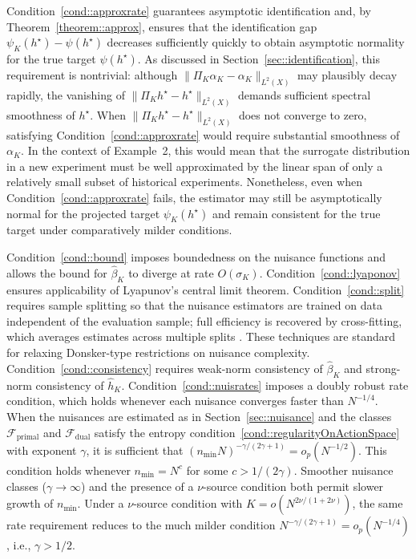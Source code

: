 \documentclass[11pt]{article}
\theoremstyle{plain}
\theoremstyle{definition}
\theoremstyle{remark}
\theoremstyle{definition}
\begin{document}
Condition~\ref{cond::approxrate} guarantees asymptotic identification and, by
Theorem~\ref{theorem::approx}, ensures that the identification gap
\(\psi_K(h^\star) - \psi(h^\star)\) decreases sufficiently quickly to obtain
asymptotic normality for the true target \(\psi(h^\star)\). As discussed in
Section~\ref{sec::identification}, this requirement is nontrivial: although
\(\|\Pi_K \alpha_K - \alpha_K\|_{L^2(X)}\) may plausibly decay rapidly, the
vanishing of \(\|\Pi_K h^\star - h^\star\|_{L^2(X)}\) demands sufficient spectral
smoothness of \(h^\star\). When \(\|\Pi_K h^\star - h^\star\|_{L^2(X)}\) does not
converge to zero, satisfying Condition~\ref{cond::approxrate} would require
substantial smoothness of \(\alpha_K\). In the context of Example~2, this would
mean that the surrogate distribution in a new experiment must be well
approximated by the linear span of only a relatively small subset of historical
experiments. Nonetheless, even when Condition~\ref{cond::approxrate} fails, the
estimator may still be asymptotically normal for the projected target
\(\psi_K(h^\star)\) and remain consistent for the true target under
comparatively milder conditions.

 

 
Condition~\ref{cond::bound} imposes boundedness on the nuisance functions and
allows the bound for \(\widehat{\beta}_K\) to diverge at rate \(O(\sigma_K)\).
Condition~\ref{cond::lyaponov} ensures applicability of Lyapunov’s central limit
theorem. Condition~\ref{cond::split} requires sample splitting so that the
nuisance estimators are trained on data independent of the evaluation sample;
full efficiency is recovered by cross-fitting, which averages estimates across
multiple splits \citep{vanderLaanRose2011, DoubleML}. These techniques are
standard for relaxing Donsker-type restrictions on nuisance complexity.
Condition~\ref{cond::consistency} requires weak-norm consistency of
\(\widehat{\beta}_K\) and strong-norm consistency of \(\widehat{h}_K\).
Condition~\ref{cond::nuisrates} imposes a doubly robust rate condition, which
holds whenever each nuisance converges faster than \(N^{-1/4}\). When the
nuisances are estimated as in Section~\ref{sec::nuisance} and the classes
\(\mathcal{F}_{\mathrm{primal}}\) and \(\mathcal{F}_{\mathrm{dual}}\) satisfy the
entropy condition~\ref{cond::regularityOnActionSpace} with exponent
\(\gamma\), it is sufficient that \((n_{\min}N)^{-\gamma/(2\gamma+1)} =
o_p(N^{-1/2})\). This condition holds whenever \(n_{\min} = N^c\) for some
\(c > 1/(2\gamma)\). Smoother nuisance classes (\(\gamma \to \infty\)) and the
presence of a \(\nu\)-source condition both permit slower growth of
\(n_{\min}\). Under a \(\nu\)-source condition with
\(K = o\!\left(N^{2\nu/(1+2\nu)}\right)\), the same rate requirement reduces to
the much milder condition \(N^{-\gamma/(2\gamma+1)} = o_p(N^{-1/4})\), i.e.,
\(\gamma > 1/2\).
\end{document}
